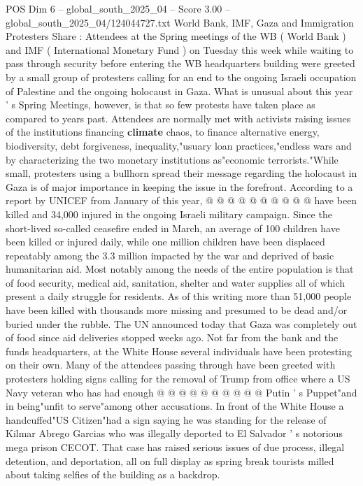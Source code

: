 \begin{textsample}{POS Dim 6 – global\_south\_2025\_04 – Score 3.00 – global\_south\_2025\_04/124044727.txt}  \label{ex:f6_pos_285}
World Bank, IMF, Gaza and Immigration Protesters Share : Attendees at the Spring meetings of the WB ( World Bank ) and IMF ( International Monetary Fund ) on Tuesday this week while waiting to pass through security before entering the WB headquarters building were greeted by a small group of protesters calling for an end to the ongoing Israeli occupation of Palestine and the ongoing holocaust in Gaza.
What is unusual about this year ' s Spring Meetings, however, is that so few protests have taken place as compared to years past.
Attendees are normally met with activists raising issues of the institutions financing \textbf{climate} chaos, to finance alternative energy, biodiversity, debt forgiveness, inequality,"usuary loan practices,"endless wars and by characterizing the two monetary institutions as"economic terrorists."While small, protesters using a bullhorn spread their message regarding the holocaust in Gaza is of major importance in keeping the issue in the forefront.
According to a report by UNICEF from January of this year, @ @ @ @ @ @ @ @ @ @ have been killed and 34,000 injured in the ongoing Israeli military campaign.
Since the short-lived so-called ceasefire ended in March, an average of 100 children have been killed or injured daily, while one million children have been displaced repeatably among the 3.3 million impacted by the war and deprived of basic humanitarian aid.
Most notably among the needs of the entire population is that of food security, medical aid, sanitation, shelter and water supplies all of which present a daily struggle for residents.
As of this writing more than 51,000 people have been killed with thousands more missing and presumed to be dead and/or buried under the rubble.
The UN announced today that Gaza was completely out of food since aid deliveries stopped weeks ago.
Not far from the bank and the funds headquarters, at the White House several individuals have been protesting on their own.
Many of the attendees passing through have been greeted with protesters holding signs calling for the removal of Trump from office where a US Navy veteran who has had enough @ @ @ @ @ @ @ @ @ @ Putin ' s Puppet"and in being"unfit to serve"among other accusations.
In front of the White House a handcuffed"US Citizen"had a sign saying he was standing for the release of Kilmar Abrego Garcias who was illegally deported to El Salvador ' s notorious mega prison CECOT.
That case has raised serious issues of due process, illegal detention, and deportation, all on full display as spring break tourists milled about taking selfies of the building as a backdrop.

\end{textsample}
